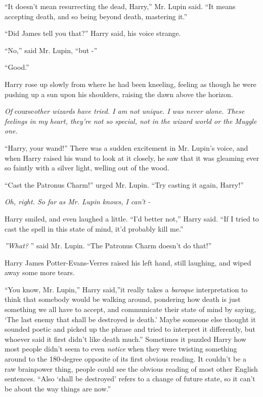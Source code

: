 ``It doesn't mean resurrecting the dead, Harry,'' Mr. Lupin said. ``It
means accepting death, and so being beyond death, mastering it.''

``Did James tell you that?'' Harry said, his voice strange.

``No,'' said Mr. Lupin, ``but -''

``Good.''

Harry rose up slowly from where he had been kneeling, feeling as though
he were pushing up a sun upon his shoulders, raising the dawn above the
horizon.

\emph{Of} course\emph{other wizards have tried. I am not unique. I was
never alone. These feelings in my heart, they're not so special, not in
the wizard world or the Muggle one.}

``Harry, your wand!'' There was a sudden excitement in Mr. Lupin's
voice, and when Harry raised his wand to look at it closely, he saw that
it was gleaming ever so faintly with a silver light, welling out of the
wood.

``Cast the Patronus Charm!'' urged Mr. Lupin. ``Try casting it again,
Harry!''

\emph{Oh, right. So far as Mr. Lupin knows, I can't -}

Harry smiled, and even laughed a little. ``I'd better not,'' Harry said.
``If I tried to cast the spell in this state of mind, it'd probably kill
me.''

\emph{''What?} '' said Mr. Lupin. ``The Patronus Charm doesn't do that!''

Harry James Potter-Evans-Verres raised his left hand, still laughing,
and wiped away some more tears.

``You know, Mr. Lupin,'' Harry said,''it really takes a \emph{baroque}
interpretation to think that somebody would be walking around, pondering
how death is just something we all have to accept, and communicate their
state of mind by saying, `The last enemy that shall be destroyed is
death.' Maybe someone else thought it sounded poetic and picked up the
phrase and tried to interpret it differently, but whoever said it first
didn't like death much.'' Sometimes it puzzled Harry how most people
didn't seem to even \emph{notice} when they were twisting something
around to the 180-degree opposite of its first obvious reading. It
couldn't be a raw brainpower thing, people could see the obvious reading
of most other English sentences. ``Also `shall be destroyed' refers to a
change of future state, so it can't be about the way things are now.''

